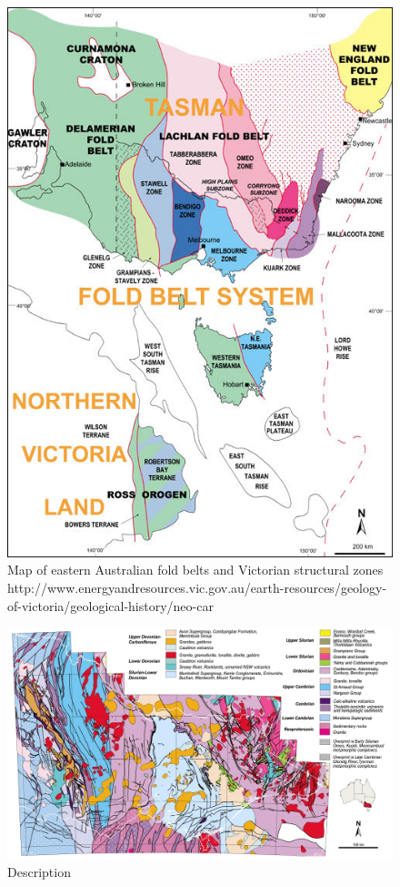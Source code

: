 \documentclass[a4paper]{article}
\begin{document}
\begin{figure}[H]
\centering
\includegraphics[width=1\textwidth]{Geology_Neoproterozoic_Fig_2.jpg}
\caption{\label{fig:VicStructuralZones}Map of eastern Australian fold belts and Victorian structural zones http://www.energyandresources.vic.gov.au/earth-resources/geology-of-victoria/geological-history/neo-car}
\end{figure}

\begin{figure}[H]
\centering
\includegraphics[width=1\textwidth]{vicmaprocktypes.jpg}
\caption{\label{fig:VicMapRockTypes}Description}
\end{figure}
\end{document}
